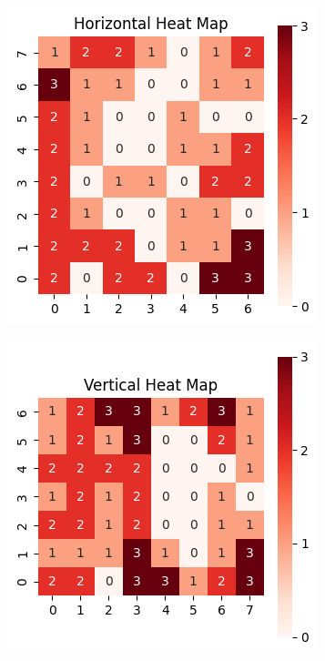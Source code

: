 \documentclass[conference]{IEEEtran}
\begin{document}
\begin{figure}[h!]
    \centering
    \begin{subfigure}[b]{0.31\textwidth}
        \includegraphics[width=\textwidth]{figures/rl_hhm.png}
        \caption{}
    \end{subfigure}
    \begin{subfigure}[b]{0.35\textwidth}
        \includegraphics[width=\textwidth]{figures/rl_vhm.png}

\end{subfigure}
\end{figure}
\end{document}

